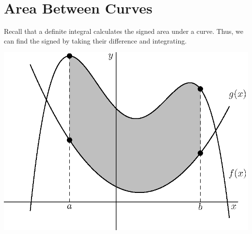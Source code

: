 
\section{Area Between Curves}

Recall that a definite integral calculates the signed area under a curve.  Thus, we can find the signed  by taking their difference and integrating.  



	\begin{center}
\includegraphics[width=400pt]{ChapterGeom/Figures/areabetweencurves.eps}
	\end{center}

